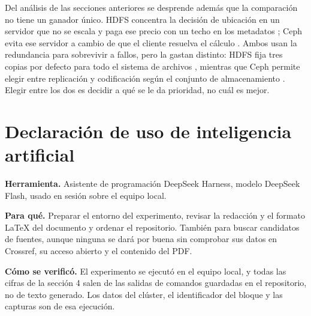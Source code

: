 \documentclass[12pt,a4paper]{article}
\newif\ifhayfuentes
\begin{document}
Del análisis de las secciones anteriores se desprende además que la comparación no tiene un ganador único. HDFS concentra la decisión de ubicación en un servidor que no se escala y paga ese precio con un techo en los metadatos \cite[p.~2830]{dhulavvagol2023performance}; Ceph evita ese servidor a cambio de que el cliente resuelva el cálculo \cite[p.~1128]{li2023ceph}. Ambos usan la redundancia para sobrevivir a fallos, pero la gastan distinto: HDFS fija tres copias por defecto para todo el sistema de archivos \cite[p.~1]{tchaye2019hpf}, mientras que Ceph permite elegir entre replicación y codificación según el conjunto de almacenamiento \cite[p.~3]{kim2021erasure}. Elegir entre los dos es decidir a qué se le da prioridad, no cuál es mejor.

\section{Declaración de uso de inteligencia artificial}

\textbf{Herramienta.} Asistente de programación DeepSeek Harness, modelo DeepSeek Flash, usado en sesión sobre el equipo local.

\textbf{Para qué.} Preparar el entorno del experimento, revisar la redacción y el formato LaTeX del documento y ordenar el repositorio. También para buscar candidatos de fuentes, aunque ninguna se dará por buena sin comprobar sus datos en Crossref, su acceso abierto y el contenido del PDF.

\textbf{Cómo se verificó.} El experimento se ejecutó en el equipo local, y todas las cifras de la sección 4 salen de las salidas de comandos guardadas en el repositorio, no de texto generado. Los datos del clúster, el identificador del bloque y las capturas son de esa ejecución.

\clearpage
\ifhayfuentes
  \selectlanguage{english}
  \printbibliography[heading=bibintoc,title={Referencias}]
  \selectlanguage{spanish}
\fi

\appendix
\renewcommand{\thesection}{Anexo \Alph{section}}
\clearpage
\end{document}
